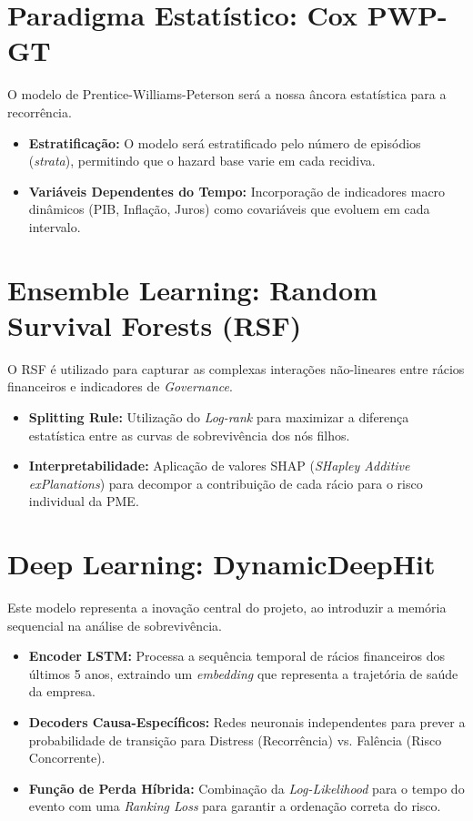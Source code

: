 \section{Paradigma Estatístico: Cox PWP-GT}

O modelo de Prentice-Williams-Peterson será a nossa âncora estatística para a recorrência.
\begin{itemize}
    \item \textbf{Estratificação:} O modelo será estratificado pelo número de episódios (\textit{strata}), permitindo que o hazard base varie em cada recidiva.
    \item \textbf{Variáveis Dependentes do Tempo:} Incorporação de indicadores macro dinâmicos (PIB, Inflação, Juros) como covariáveis que evoluem em cada intervalo.
\end{itemize}

\section{Ensemble Learning: Random Survival Forests (RSF)}

O RSF é utilizado para capturar as complexas interações não-lineares entre rácios financeiros e indicadores de \textit{Governance}.
\begin{itemize}
    \item \textbf{Splitting Rule:} Utilização do \textit{Log-rank} para maximizar a diferença estatística entre as curvas de sobrevivência dos nós filhos.
    \item \textbf{Interpretabilidade:} Aplicação de valores SHAP (\textit{SHapley Additive exPlanations}) para decompor a contribuição de cada rácio para o risco individual da PME.
\end{itemize}

\section{Deep Learning: DynamicDeepHit}

Este modelo representa a inovação central do projeto, ao introduzir a memória sequencial na análise de sobrevivência.
\begin{itemize}
    \item \textbf{Encoder LSTM:} Processa a sequência temporal de rácios financeiros dos últimos 5 anos, extraindo um \textit{embedding} que representa a trajetória de saúde da empresa.
    \item \textbf{Decoders Causa-Específicos:} Redes neuronais independentes para prever a probabilidade de transição para Distress (Recorrência) vs. Falência (Risco Concorrente).
    \item \textbf{Função de Perda Híbrida:} Combinação da \textit{Log-Likelihood} para o tempo do evento com uma \textit{Ranking Loss} para garantir a ordenação correta do risco.
\end{itemize}

